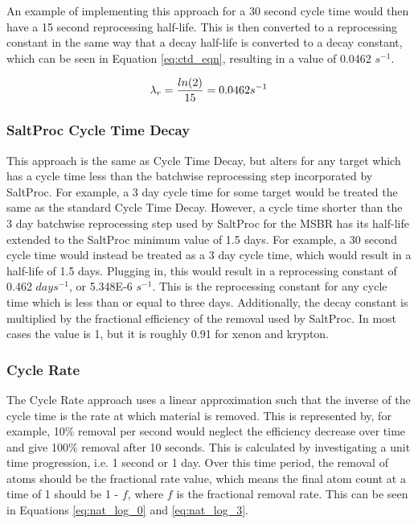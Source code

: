 An example of implementing this approach for a 30 second cycle time would then have a 15 second reprocessing half-life. This is then converted to a reprocessing constant in the same way that a decay half-life is converted to a decay constant, which can be seen in Equation \eqref{eq:ctd_eqn}, resulting in a value of 0.0462 $s^{-1}$.

\begin{equation} \hfill
\lambda_{r} = \frac{ln(2)}{15} = 0.0462 s^{-1}
\hfill\label{eq:ctd_eqn} \end{equation}

\subsubsection{SaltProc Cycle Time Decay}

This approach is the same as Cycle Time Decay, but alters for any target which has a cycle time less than the batchwise reprocessing step incorporated by SaltProc. For example, a 3 day cycle time for some target would be treated the same as the standard Cycle Time Decay. However, a cycle time shorter than the 3 day batchwise reprocessing step used by SaltProc for the MSBR has its half-life extended to the SaltProc minimum value of 1.5 days. For example, a 30 second cycle time would instead be treated as a 3 day cycle time, which would result in a half-life of 1.5 days. Plugging in, this would result in a reprocessing constant of 0.462 $days^{-1}$, or 5.348E-6 $s^{-1}$. This is the reprocessing constant for any cycle time which is less than or equal to three days. Additionally, the decay constant is multiplied by the fractional efficiency of the removal used by SaltProc. In most cases the value is 1, but it is roughly 0.91 for xenon and krypton.

\subsubsection{Cycle Rate}

The Cycle Rate approach uses a linear approximation such that the inverse of the cycle time is the rate at which material is removed. This is represented by, for example, 10\% removal per second would neglect the efficiency decrease over time and give 100\% removal after 10 seconds. This is calculated by investigating a unit time progression, i.e. 1 second or 1 day. Over this time period, the removal of atoms should be the fractional rate value, which means the final atom count at a time of 1 should be 1 - $f$, where $f$ is the fractional removal rate. This can be seen in Equations \eqref{eq:nat_log_0} and \eqref{eq:nat_log_3}.

